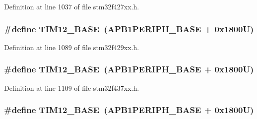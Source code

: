Definition at line 1037 of file stm32f427xx.\+h.

\subsubsection[{\texorpdfstring{T\+I\+M12\+\_\+\+B\+A\+SE}{TIM12_BASE}}]{\setlength{\rightskip}{0pt plus 5cm}\#define T\+I\+M12\+\_\+\+B\+A\+SE~({\bf A\+P\+B1\+P\+E\+R\+I\+P\+H\+\_\+\+B\+A\+SE} + 0x1800\+U)}\hypertarget{group___peripheral__memory__map_ga33dea32fadbaecea161c2ef7927992fd}{}\label{group___peripheral__memory__map_ga33dea32fadbaecea161c2ef7927992fd}


Definition at line 1089 of file stm32f429xx.\+h.

\subsubsection[{\texorpdfstring{T\+I\+M12\+\_\+\+B\+A\+SE}{TIM12_BASE}}]{\setlength{\rightskip}{0pt plus 5cm}\#define T\+I\+M12\+\_\+\+B\+A\+SE~({\bf A\+P\+B1\+P\+E\+R\+I\+P\+H\+\_\+\+B\+A\+SE} + 0x1800\+U)}\hypertarget{group___peripheral__memory__map_ga33dea32fadbaecea161c2ef7927992fd}{}\label{group___peripheral__memory__map_ga33dea32fadbaecea161c2ef7927992fd}


Definition at line 1109 of file stm32f437xx.\+h.

\subsubsection[{\texorpdfstring{T\+I\+M12\+\_\+\+B\+A\+SE}{TIM12_BASE}}]{\setlength{\rightskip}{0pt plus 5cm}\#define T\+I\+M12\+\_\+\+B\+A\+SE~({\bf A\+P\+B1\+P\+E\+R\+I\+P\+H\+\_\+\+B\+A\+SE} + 0x1800\+U)}\hypertarget{group___peripheral__memory__map_ga33dea32fadbaecea161c2ef7927992fd}{}\label{group___peripheral__memory__map_ga33dea32fadbaecea161c2ef7927992fd}


